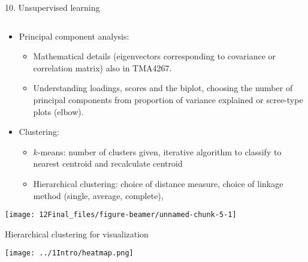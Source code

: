 \documentclass[10pt,ignorenonframetext,]{beamer}
\providecommand{\tightlist}{%
  \setlength{\itemsep}{0pt}\setlength{\parskip}{0pt}}
\begin{document}
\begin{frame}

\begin{block}{10. Unsupervised learning}

\(~\)

\begin{itemize}
\tightlist
\item
  Principal component analysis:

  \begin{itemize}
  \tightlist
  \item
    Mathematical details (eigenvectors corresponding to covariance or
    correlation matrix) also in TMA4267.
  \item
    Understanding loadings, scores and the biplot, choosing the number
    of principal components from proportion of variance explained or
    scree-type plots (elbow).
  \end{itemize}
\end{itemize}

\vspace{2mm}

\begin{itemize}
\tightlist
\item
  Clustering:

  \begin{itemize}
  \tightlist
  \item
    \(k\)-means: number of clusters given, iterative algorithm to
    classify to nearest centroid and recalculate centroid
  \item
    Hierarchical clustering: choice of distance measure, choice of
    linkage method (single, average, complete),
  \end{itemize}
\end{itemize}

\end{block}

\end{frame}

\begin{frame}

\centering

\texttt{[image: 12Final\_files/figure-beamer/unnamed-chunk-5-1]}

\end{frame}

\begin{frame}

Hierarchical clustering for visualization

\centering

\texttt{[image: ../1Intro/heatmap.png]}

\end{frame}
\end{document}

